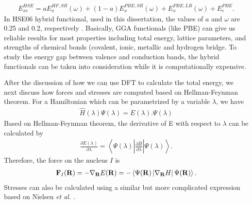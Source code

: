 	\begin{equation}
	\begin{aligned}
        E_{xc}^{HSE} = aE_x^{HF,SR}(\omega) + (1-a)E_x^{PBE,SR}(\omega) + E_x^{PBE,LR}(\omega) + E_c^{PBE}.
    \end{aligned}
	\end{equation}
In HSE06 hybrid functional, used in this dissertation, the values of $a$ and $\omega$ are 0.25 and 0.2, respectively \cite{krukau2006influence}. Basically, GGA functionals (like PBE) can give us reliable results for most properties including total energy, lattice parameters, and strengths of chemical bonds (covalent, ionic, metallic and hydrogen bridge. To study the energy gap between valence and conduction bands, the hybrid functionals can be taken into consideration while it is computationally expensive.

After the discussion of how we can use DFT to calculate the total energy, we next discuss how forces and stresses are computed based on Hellman-Feynman theorem. For a Hamiltonian which can be parametrized by a variable $\lambda$, we have
	\begin{equation}
	\begin{aligned}
        \hat{H}(\lambda) \Psi(\lambda) = E(\lambda). \Psi(\lambda)
    \end{aligned}
	\end{equation}
Based on Hellman-Feynman theorem, the derivative of E with respect to $\lambda$ can be calculated by
	\begin{equation}
	\begin{aligned}
        \frac{\partial E (\lambda)}{\partial \lambda} = \left \langle \Psi (\lambda) \left|  \frac{\partial \hat{H}}{\partial \lambda}   \right|  \Psi (\lambda) \right\rangle.
    \end{aligned}
	\end{equation}
Therefore, the force on the nucleus $I$ is
	\begin{equation}
	\begin{aligned}
        {\bf F}_I({\bf R}) = - \nabla_{\bf R} E({\bf R}) = -\left \langle \Psi ({\bf R})\left|  \nabla_{\bf R} H \right| \Psi({\bf R})   \right \rangle.
    \end{aligned}
	\end{equation}
Stresses can also be calculated using a similar but more complicated expression based on Nielsen {\it et al.} \cite{nielsen1985quantum}.

